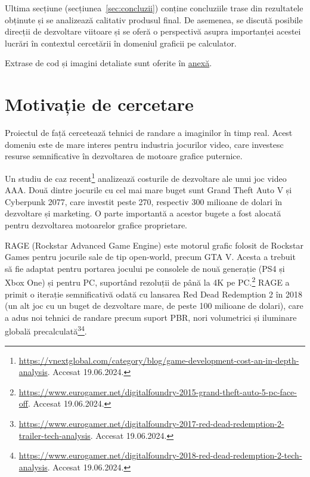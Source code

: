 \documentclass[12pt,a4paper]{report}
\numberwithin{equation}{section} %
\begin{document}
Ultima secțiune (secțiunea~\ref{sec:concluzii}) conține concluziile trase din
rezultatele obținute și se analizează calitativ produsul final. De asemenea, se
discută posibile direcții de dezvoltare viitoare și se oferă o perspectivă asupra
importanței acestei lucrări în contextul cercetării în domeniul graficii pe calculator.

Extrase de cod și imagini detaliate sunt oferite în \hyperref[anexa]{anexă}.

\chapter{\label{sec:motivatie}Motivație de cercetare}

Proiectul de față cercetează tehnici de randare a imaginilor în timp real. Acest
domeniu este de mare interes pentru industria jocurilor video, care investesc
resurse semnificative în dezvoltarea de motoare grafice puternice.

Un studiu de caz
recent\footnote{\label{vnextglobal}\url{https://vnextglobal.com/category/blog/game-development-cost-an-in-depth-analysis}. Accesat 19.06.2024.}
analizează costurile de dezvoltare ale unui joc video AAA. Două dintre jocurile
cu cel mai mare buget sunt Grand Theft Auto V și Cyberpunk 2077, care investit
peste 270, respectiv 300 milioane de dolari în dezvoltare și marketing. O parte
importantă a acestor bugete a fost alocată pentru dezvoltarea motoarelor grafice
proprietare.

RAGE (Rockstar Advanced Game Engine) este motorul grafic folosit
de Rockstar Games pentru jocurile sale de tip open-world, precum GTA V. Acesta a
trebuit să fie adaptat pentru portarea jocului pe consolele de nouă generație
(PS4 și Xbox One) și pentru PC, suportând rezoluții de până la 4K pe PC.\footnote{\url{https://www.eurogamer.net/digitalfoundry-2015-grand-theft-auto-5-pc-face-off}. Accesat 19.06.2024.}
RAGE a primit o iterație semnificativă odată cu lansarea Red Dead Redemption 2 în 2018
(un alt joc cu un buget de dezvoltare mare, de peste 100 milioane de dolari),
care a adus noi tehnici de randare precum suport PBR, nori volumetrici și iluminare globală
precalculată\footnote{\url{https://www.eurogamer.net/digitalfoundry-2017-red-dead-redemption-2-trailer-tech-analysis}. Accesat 19.06.2024.}\footnote{\url{https://www.eurogamer.net/digitalfoundry-2018-red-dead-redemption-2-tech-analysis}. Accesat 19.06.2024.}.
\end{document}
